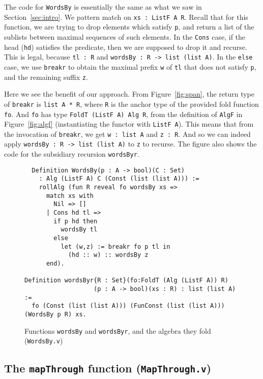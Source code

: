 \documentclass[a4paper,USenglish]{lipics-v2021}
\begin{document}
The code for \verb|WordsBy| is essentially
the same as what we saw in Section~\ref{sec:intro}.  We pattern match
on \verb|xs : ListF A R|.  Recall that for this function, we are
trying to drop elements which satisfy \verb|p|, and return a list of
the sublists between maximal sequences of such elements.  In the
\verb|Cons| case, if the head (\verb|hd|) satisfies the predicate, then we are
supposed to drop it and recurse.  This is legal, because \verb|tl : R|
and \verb|wordsBy : R -> list (list A)|.  In the \verb|else| case,
we use \verb|breakr| to obtain the maximal prefix \verb|w| of \verb|tl| that
does not satisfy \verb|p|, and the remaining suffix \verb|z|.

Here we see the benefit of our approach.  From Figure~\ref{fig:span},
the return type of \verb|breakr| is \verb|list A * R|, where \verb|R|
is the anchor type of the provided fold function \verb|fo|.  And
\verb|fo| has type \verb|FoldT (ListF A) Alg R|, from the definition
of \verb|AlgF| in Figure~\ref{fig:algf} (instantiating the functor
with \verb|ListF A|).  This means that from the invocation of
\verb|breakr|, we get \verb|w : list A| and \verb|z : R|.  And so we
can indeed apply \verb|wordsBy : R -> list (list A)| to
\verb|z| to recurse.  The figure also shows the code for the subsidiary
recursion \verb|wordsByr|.

\begin{figure}
\begin{verbatim}
  Definition WordsBy(p : A -> bool)(C : Set)
    : Alg (ListF A) C (Const (list (list A))) :=
    rollAlg (fun R reveal fo wordsBy xs => 
      match xs with
        Nil => [] 
      | Cons hd tl =>
        if p hd then
          wordsBy tl
        else
          let (w,z) := breakr fo p tl in
            (hd :: w) :: wordsBy z
      end).

Definition wordsByr{R : Set}(fo:FoldT (Alg (ListF A)) R)
                   (p : A -> bool)(xs : R) : list (list A) :=
  fo (Const (list (list A))) (FunConst (list (list A))) (WordsBy p R) xs.
\end{verbatim}
\caption{Functions  \texttt{wordsBy} and \texttt{wordsByr}, and the algebra they
  fold (\texttt{WordsBy.v})}
\label{fig:wordsby}
\end{figure}

\subsection{The \texttt{mapThrough} function (\texttt{MapThrough.v})}
\end{document}
